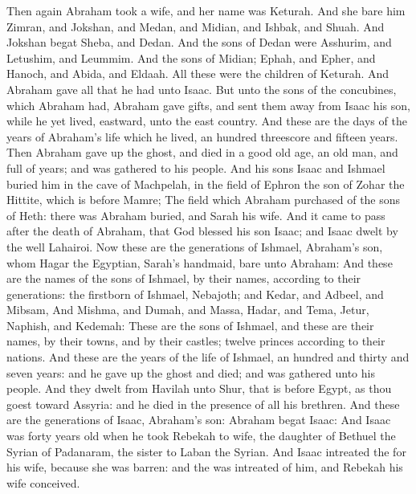 \begin{biblechapter} %
 Then again Abraham took a wife, and her name was Keturah.
\verse And she bare him Zimran, and Jokshan, and Medan, and Midian, and Ishbak, and Shuah.
\verse And Jokshan begat Sheba, and Dedan. And the sons of Dedan were Asshurim, and Letushim, and Leummim.
\verse And the sons of Midian; Ephah, and Epher, and Hanoch, and Abida, and Eldaah. All these were the children of Keturah.
\verse And Abraham gave all that he had unto Isaac.
\verse But unto the sons of the concubines, which Abraham had, Abraham gave gifts, and sent them away from Isaac his son, while he yet lived, eastward, unto the east country.
\verse And these are the days of the years of Abraham's life which he lived, an hundred threescore and fifteen years.
\verse Then Abraham gave up the ghost, and died in a good old age, an old man, and full of years; and was gathered to his people.
\verse And his sons Isaac and Ishmael buried him in the cave of Machpelah, in the field of Ephron the son of Zohar the Hittite, which is before Mamre;
\verse The field which Abraham purchased of the sons of Heth: there was Abraham buried, and Sarah his wife.
\verse And it came to pass after the death of Abraham, that God blessed his son Isaac; and Isaac dwelt by the well Lahairoi.
 Now these are the generations of Ishmael, Abraham's son, whom Hagar the Egyptian, Sarah's handmaid, bare unto Abraham:
\verse And these are the names of the sons of Ishmael, by their names, according to their generations: the firstborn of Ishmael, Nebajoth; and Kedar, and Adbeel, and Mibsam,
\verse And Mishma, and Dumah, and Massa,
\verse Hadar, and Tema, Jetur, Naphish, and Kedemah:
\verse These are the sons of Ishmael, and these are their names, by their towns, and by their castles; twelve princes according to their nations.
\verse And these are the years of the life of Ishmael, an hundred and thirty and seven years: and he gave up the ghost and died; and was gathered unto his people.
\verse And they dwelt from Havilah unto Shur, that is before Egypt, as thou goest toward Assyria: and he died in the presence of all his brethren.
 And these are the generations of Isaac, Abraham's son: Abraham begat Isaac:
\verse And Isaac was forty years old when he took Rebekah to wife, the daughter of Bethuel the Syrian of Padanaram, the sister to Laban the Syrian.
\verse And Isaac intreated the \LORD for his wife, because she was barren: and the \LORD was intreated of him, and Rebekah his wife conceived.

\end{biblechapter}
